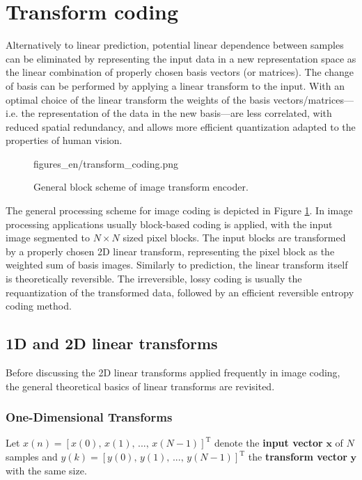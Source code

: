 \section{Transform coding}
Alternatively to linear prediction, potential linear dependence between samples can be eliminated by representing the input data in a new representation space as the linear combination of properly chosen basis vectors (or matrices).
The change of basis can be performed by applying a linear transform to the input.
With an optimal choice of the linear transform the weights of the basis vectors/matrices---i.e. the representation of the data in the new basis---are less correlated, with reduced spatial redundancy, and allows more efficient quantization adapted to the properties of human vision.

\begin{figure}[h!]
	\centering
	\begin{overpic}[width = 0.8\columnwidth ]{figures_en/transform_coding.png}
	\end{overpic}
	\caption{General block scheme of image transform encoder.}
	\label{Fig:transform_coding}
\end{figure}
The general processing scheme for image coding is depicted in Figure \ref{Fig:transform_coding}.
In image processing applications usually block-based coding is applied, with the input image segmented to $N\times N$ sized pixel blocks.
The input blocks are transformed by a properly chosen 2D linear transform, representing the pixel block as the weighted sum of basis images.
Similarly to prediction, the linear transform itself is theoretically reversible.
The irreversible, lossy coding is usually the requantization of the transformed data, followed by an efficient reversible entropy coding method.

\subsection{1D and 2D linear transforms}

Before discussing the 2D linear transforms applied frequently in image coding, the general theoretical basics of linear transforms are revisited.

\subsubsection{One-Dimensional Transforms}
Let $x(n) = [x(0),\, x(1),\,...,\, x(N-1)]^{\mathrm{T}}$ denote the \textbf{input vector} $\mathbf{x}$ of $N$ samples and $y(k) = [y(0),\, y(1),\,...,\, y(N-1)]^{\mathrm{T}}$ the \textbf{transform vector} $\mathbf{y}$ with the same size.


